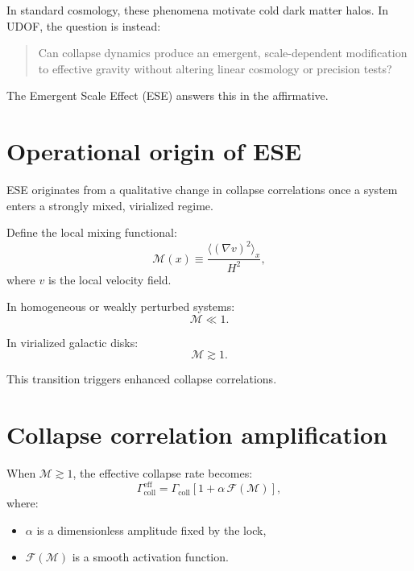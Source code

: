 \documentclass[11pt]{book}
\begin{document}
In standard cosmology, these phenomena motivate cold dark matter halos.
In UDOF, the question is instead:

\begin{quote}
Can collapse dynamics produce an emergent, scale-dependent modification
to effective gravity without altering linear cosmology or precision tests?
\end{quote}

The Emergent Scale Effect (ESE) answers this in the affirmative.

\section{Operational origin of ESE}

ESE originates from a qualitative change in collapse correlations once a
system enters a strongly mixed, virialized regime.

Define the local mixing functional:
\begin{equation}
\mathcal{M}(x) \equiv
\frac{\langle (\nabla v)^2 \rangle_x}{H^2},
\end{equation}
where $v$ is the local velocity field.

In homogeneous or weakly perturbed systems:
\begin{equation}
\mathcal{M} \ll 1.
\end{equation}

In virialized galactic disks:
\begin{equation}
\mathcal{M} \gtrsim 1.
\end{equation}

This transition triggers enhanced collapse correlations.

\section{Collapse correlation amplification}

When $\mathcal{M} \gtrsim 1$, the effective collapse rate becomes:
\begin{equation}
\Gamma_{\mathrm{coll}}^{\mathrm{eff}}
=
\Gamma_{\mathrm{coll}}
\left[1 + \alpha\,\mathcal{F}(\mathcal{M})\right],
\end{equation}
where:
\begin{itemize}
\item $\alpha$ is a dimensionless amplitude fixed by the lock,
\item $\mathcal{F}(\mathcal{M})$ is a smooth activation function.
\end{itemize}
\end{document}

